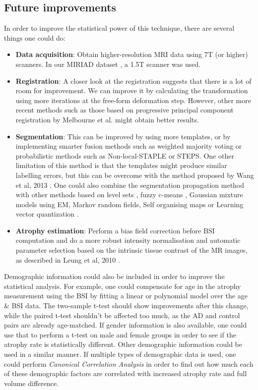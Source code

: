 \documentclass[11pt,a4paper,oneside]{report}
\begin{document}


\subsection*{Future improvements}

In order to improve the statistical power of this technique, there are several things one could do:
\begin{itemize}
 \item \textbf{Data acquisition}: Obtain higher-resolution MRI data using 7T (or higher) scanners. In our MIRIAD dataset \cite{malone2013miriad}, a 1.5T scanner was used. 
 \item \textbf{Registration}: A closer look at the registration suggests that there is a lot of room for improvement. We can improve it by calculating the transformation using more iterations at the free-form deformation step. However, other more recent methods such as those based on progressive principal component registration by Melbourne et al. \cite{melbourne2007registration} might obtain better results.
 \item \textbf{Segmentation}: This can be improved by using more templates, or by implementing smarter fusion methods such as weighted majority voting or probabilistic methods such as Non-local-STAPLE or STEPS. One other limitation of this method is that the templates might produce similar labelling errors, but this can be overcome with the method proposed by Wang et al, 2013 \cite{wang2013multi}. One could also combine the segmentation propagation method with other methods based on level sets \cite{cremers2007review}, fuzzy c-means \cite{bezdek1984fcm}, Gaussian mixture models using EM, Markov random fields, Self organising maps \cite{bhandarkar1997multiscale} or Learning vector quantization \cite{karayiannis1999segmentation}.
 \item \textbf{Atrophy estimation}: Perform a bias field correction before BSI computation and do a more robust intensity normalisation and automatic parameter selection based on the intrinsic tissue contrast of the MR images, as described in Leung et al, 2010 \cite{leung2010robust}.
\end{itemize}

Demographic information could also be included in order to improve the statistical analysis. For example, one could compensate for age in the atrophy measurement using the BSI by fitting a linear or polynomial model over the age \& BSI data. The two-sample t-test should show improvements after this change, while the paired t-test shouldn't be affected too much, as the AD and control pairs are already age-matched. If gender information is also available, one could use that to perform a t-test on male and female groups in order to see if the atrophy rate is statistically different. Other demographic information could be used in a similar manner. If multiple types of demographic data is used, one could perform \textit{Canonical Correlation Analysis} in order to find out how much each of these demographic factors are correlated with increased atrophy rate and full volume difference.




\end{document}
